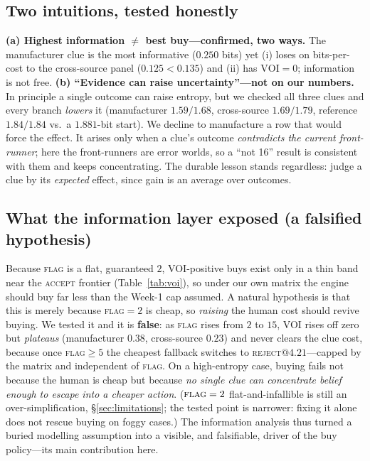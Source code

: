 \documentclass[11pt]{article}
\begin{document}
\subsection{Two intuitions, tested honestly}
\textbf{(a) Highest information $\neq$ best buy---confirmed, two ways.} The manufacturer
clue is the most informative ($0.250$ bits) yet (i) loses on bits-per-cost to the
cross-source panel ($0.125<0.135$) and (ii) has $\text{VOI}=0$; information is not
free. \textbf{(b) ``Evidence can raise uncertainty''---not on our numbers.} In
principle a single outcome can raise entropy, but we checked all three clues and every
branch \emph{lowers} it (manufacturer $1.59/1.68$, cross-source $1.69/1.79$, reference
$1.84/1.84$ vs.\ a $1.881$-bit start). We decline to manufacture a row that would force
the effect. It arises only when a clue's outcome \emph{contradicts the current
front-runner}; here the front-runners are error worlds, so a ``not 16'' result is
consistent with them and keeps concentrating. The durable lesson stands regardless:
judge a clue by its \emph{expected} effect, since gain is an average over outcomes.

\subsection{What the information layer exposed (a falsified hypothesis)}
Because \textsc{flag} is a flat, guaranteed $2$, VOI-positive buys exist only in a thin
band near the \textsc{accept} frontier (Table~\ref{tab:voi}), so under our own matrix
the engine should buy far less than the Week-1 cap assumed. A natural hypothesis is
that this is merely because \textsc{flag}$=2$ is cheap, so \emph{raising} the human
cost should revive buying. We tested it and it is \textbf{false}: as \textsc{flag}
rises from $2$ to $15$, VOI rises off zero but \emph{plateaus} (manufacturer $0.38$,
cross-source $0.23$) and never clears the clue cost, because once \textsc{flag}$\ge5$
the cheapest fallback switches to \textsc{reject}$@4.21$---capped by the matrix and
independent of \textsc{flag}. On a high-entropy case, buying fails not because the
human is cheap but because \emph{no single clue can concentrate belief enough to escape
into a cheaper action}. ($\textsc{flag}=2$ flat-and-infallible is still an
over-simplification, \S\ref{sec:limitations}; the tested point is narrower: fixing it
alone does not rescue buying on foggy cases.) The information analysis thus turned a
buried modelling assumption into a visible, and falsifiable, driver of the buy
policy---its main contribution here.
\end{document}
